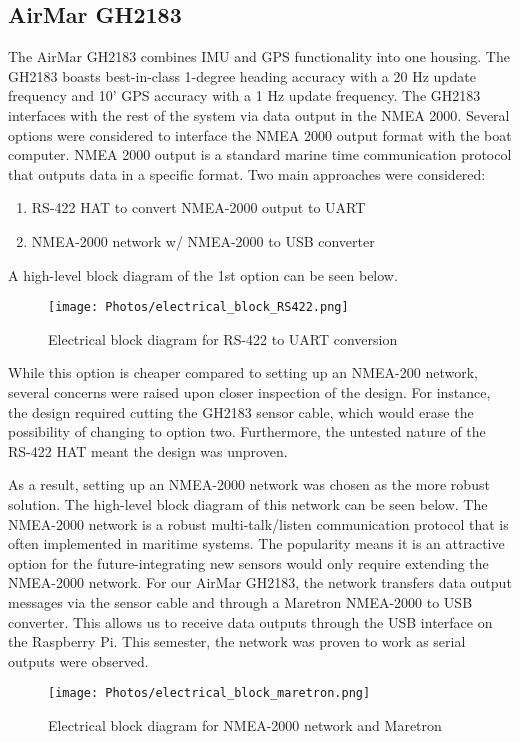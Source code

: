 \documentclass{article}
\begin{document}
\subsection{AirMar GH2183}
The AirMar GH2183 combines IMU and GPS functionality into one housing. The GH2183 boasts best-in-class 1-degree heading accuracy with a 20 Hz update frequency and 10' GPS accuracy with a 1 Hz update frequency. The GH2183 interfaces with the rest of the system via data output in the NMEA 2000. Several options were considered to interface the NMEA 2000 output format with the boat computer. NMEA 2000 output is a standard marine time communication protocol that outputs data in a specific format. Two main approaches were considered:
\begin{enumerate}
    \item RS-422 HAT to convert NMEA-2000 output to UART
    \item NMEA-2000 network w/ NMEA-2000 to USB converter   
\end{enumerate}
A high-level block diagram of the 1st option can be seen below. 
\begin{figure}[h]
    \centering
    \texttt{[image: Photos/electrical\_block\_RS422.png]}
    \caption{Electrical block diagram for RS-422 to UART conversion}
    \label{fig: Photos/electrical_blockRS422.png}
\end{figure}

While this option is cheaper compared to setting up an NMEA-200 network, several concerns were raised upon closer inspection of the design. For instance, the design required cutting the GH2183 sensor cable, which would erase the possibility of changing to option two. Furthermore, the untested nature of the RS-422 HAT meant the design was unproven. 

As a result, setting up an NMEA-2000 network was chosen as the more robust solution. The high-level block diagram of this network can be seen below. The NMEA-2000 network is a robust multi-talk/listen communication protocol that is often implemented in maritime systems. The popularity means it is an attractive option for the future-integrating new sensors would only require extending the NMEA-2000 network. For our AirMar GH2183, the network transfers data output messages via the sensor cable and through a Maretron NMEA-2000 to USB converter. This allows us to receive data outputs through the USB interface on the Raspberry Pi. This semester, the network was proven to work as serial outputs were observed. 
\begin{figure}[h]
    \centering
    \texttt{[image: Photos/electrical\_block\_maretron.png]}
    \caption{Electrical block diagram for NMEA-2000 network and Maretron}
    \label{fig: Photos/electrical_blockRS422.png}
\end{figure}
\end{document}

